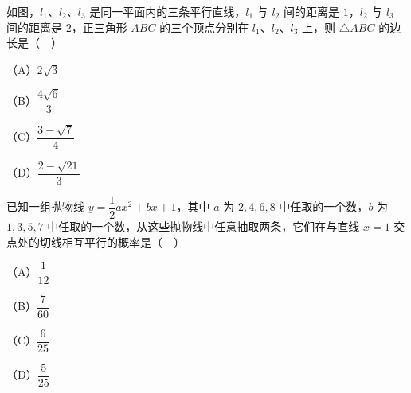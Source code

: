 \begin{question}
如图，$l_1$、$l_2$、$l_3$ 是同一平面内的三条平行直线，$l_1$ 与 $l_2$ 间的距离是 $1$，$l_2$ 与 $l_3$ 间的距离是 $2$，正三角形 $ABC$ 的三个顶点分别在 $l_1$、$l_2$、$l_3$ 上，则 $\triangle ABC$ 的边长是（　）
\nopagebreak[4]
\begin{center}\end{center}
\nopagebreak[4]
（A）$2\sqrt3$

（B）$\dfrac{4\sqrt6}{3}$

（C）$\dfrac{3-\sqrt7}{4}$

（D）$\dfrac{2-\sqrt{21}}{3}$

\end{question}
\begin{question}
已知一组抛物线 $y=\dfrac12ax^2+bx+1$，其中 $a$ 为 $2,4,6,8$ 中任取的一个数，$b$ 为 $1,3,5,7$ 中任取的一个数，从这些抛物线中任意抽取两条，它们在与直线 $x=1$ 交点处的切线相互平行的概率是（　）

（A）$\dfrac1{12}$

（B）$\dfrac{7}{60}$

（C）$\dfrac6{25}$

（D）$\dfrac5{25}$

\end{question}

